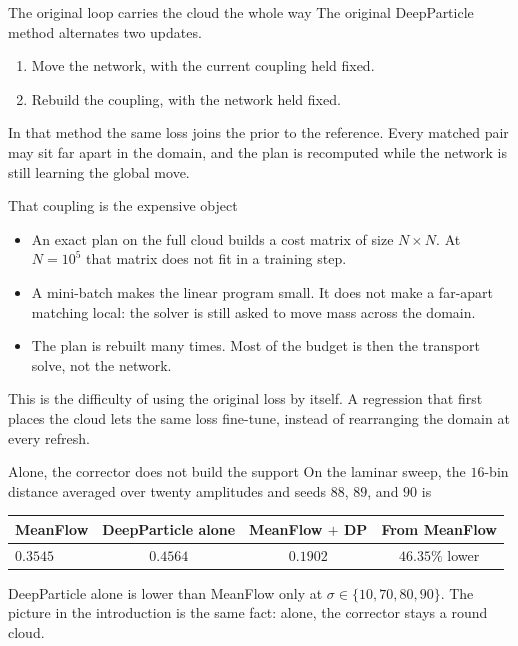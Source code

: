 \documentclass[aspectratio=169,11pt,t]{beamer}
\begin{document}
\begin{frame}{The original loop carries the cloud the whole way}
  The original DeepParticle method alternates two updates.
  \vspace{0.4em}
  \begin{enumerate}
    \item Move the network, with the current coupling held fixed.
    \item Rebuild the coupling, with the network held fixed.
  \end{enumerate}
  \vspace{0.45em}
  In that method the same loss joins the prior to the reference.
  Every matched pair may sit far apart in the domain, and the plan is recomputed while the network is still learning the global move.
\end{frame}

\begin{frame}{That coupling is the expensive object}
  \begin{itemize}
    \item An exact plan on the full cloud builds a cost matrix of size $N\times N$. At $N=10^5$ that matrix does not fit in a training step.
    \item A mini-batch makes the linear program small. It does not make a far-apart matching local: the solver is still asked to move mass across the domain.
    \item The plan is rebuilt many times. Most of the budget is then the transport solve, not the network.
  \end{itemize}
  \vspace{0.45em}
  This is the difficulty of using the original loss by itself.
  A regression that first places the cloud lets the same loss fine-tune, instead of rearranging the domain at every refresh.
\end{frame}

\begin{frame}{Alone, the corrector does not build the support}
  On the laminar sweep, the $16$-bin distance averaged over twenty amplitudes and seeds $88$, $89$, and $90$ is
  \vspace{0.35em}
  \begin{tabular}{lccc}
    \toprule
    MeanFlow & DeepParticle alone & MeanFlow $+$ DP & From MeanFlow \\
    \midrule
    $0.3545$ & $0.4564$ & $0.1902$ & $46.35\%$ lower \\
    \bottomrule
  \end{tabular}
  \vspace{0.3em}
  DeepParticle alone is lower than MeanFlow only at $\sigma\in\{10,70,80,90\}$.
  The picture in the introduction is the same fact: alone, the corrector stays a round cloud.
\end{frame}
\end{document}
